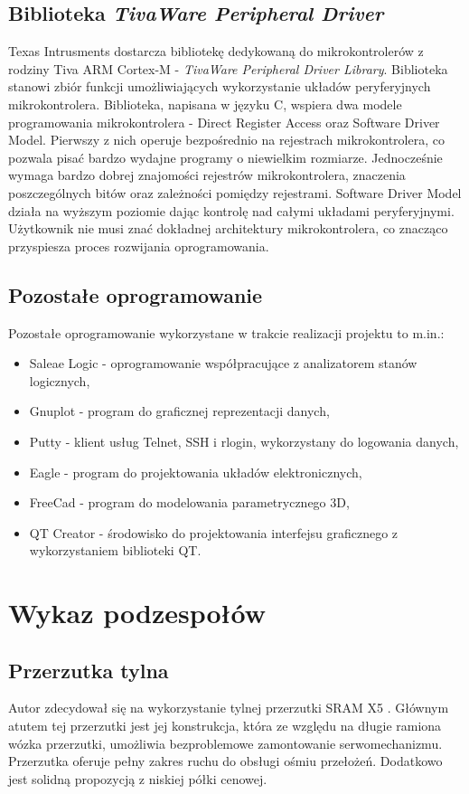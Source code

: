 \subsection{Biblioteka \textit{TivaWare Peripheral Driver}}
Texas Intrusments dostarcza bibliotekę dedykowaną do mikrokontrolerów z rodziny Tiva ARM Cortex-M - \textit{TivaWare  Peripheral Driver Library}. Biblioteka stanowi zbiór funkcji umożliwiających wykorzystanie układów peryferyjnych mikrokontrolera. Biblioteka, napisana w języku C, wspiera dwa modele programowania mikrokontrolera - Direct Register Access oraz Software Driver Model. Pierwszy z nich operuje bezpośrednio na rejestrach mikrokontrolera, co pozwala pisać bardzo wydajne programy o niewielkim rozmiarze. Jednocześnie wymaga bardzo dobrej znajomości rejestrów mikrokontrolera, znaczenia poszczególnych bitów oraz zależności pomiędzy rejestrami. Software Driver Model działa na wyższym poziomie dając kontrolę nad całymi układami peryferyjnymi. Użytkownik nie musi znać dokładnej architektury mikrokontrolera, co znacząco przyspiesza proces rozwijania oprogramowania. 
\subsection{Pozostałe oprogramowanie}
Pozostałe oprogramowanie wykorzystane w trakcie realizacji projektu to m.in.:
\begin{itemize}
\item
Saleae Logic - oprogramowanie współpracujące z analizatorem stanów logicznych,
\item
Gnuplot - program do graficznej reprezentacji danych,
\item
Putty - klient usług Telnet, SSH i rlogin, wykorzystany do logowania danych,
\item
Eagle - program do projektowania układów elektronicznych,
\item
FreeCad - program do modelowania parametrycznego 3D,
\item
QT Creator - środowisko do projektowania interfejsu graficznego z wykorzystaniem biblioteki QT.
\end{itemize}
\section{Wykaz podzespołów}
\subsection{Przerzutka tylna}
Autor zdecydował się na wykorzystanie tylnej przerzutki SRAM X5 \cite{sramX5}. Głównym atutem tej przerzutki jest jej konstrukcja, która ze względu na długie ramiona wózka przerzutki, umożliwia bezproblemowe zamontowanie serwomechanizmu. Przerzutka oferuje pełny zakres ruchu do obsługi ośmiu przełożeń. Dodatkowo jest solidną propozycją z niskiej półki cenowej.
